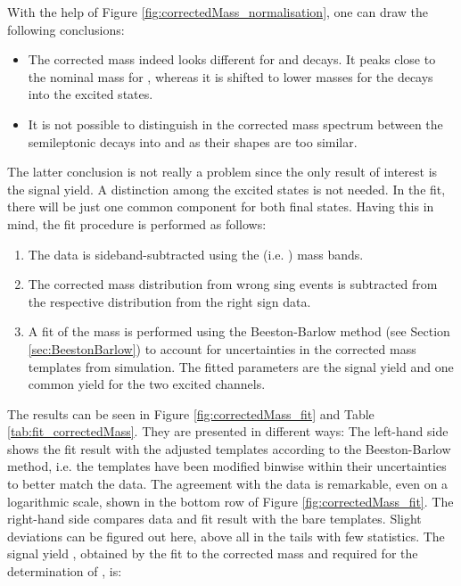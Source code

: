 \noindent With the help of Figure \ref{fig:correctedMass_normalisation}, one can draw the following conclusions:
\begin{itemize}
    \item The corrected \pKpi\mun mass indeed looks different for \LbToLcmunu and \decay{\Lb}{\Lcstar\mun\neumb} decays.
          It peaks close to the nominal \Lb mass for \LbToLcmunu, whereas it is shifted to lower masses for the decays into the excited \Lcstar states. 
    \item It is not possible to distinguish in the \Lb corrected mass spectrum between the semileptonic \Lb decays into  and  as their shapes are too similar.
\end{itemize}
The latter conclusion is not really a problem since the only result of interest is the \LbToLcmunu signal yield. 
A distinction among the excited states is not needed.
In the fit, there will be just one common component for both final states.
Having this in mind, the fit procedure is performed as follows:
\begin{enumerate}
    \item The data is sideband-subtracted using the \pKpi (i.e. \Lc) mass bands.
    \item The corrected \pKpi\mun mass distribution from wrong sing events is subtracted from the respective distribution from the right sign data.
    \item A fit of the \pKpi\mun mass is performed using the Beeston-Barlow method (see Section \ref{sec:BeestonBarlow}) to account for uncertainties in the corrected mass templates from simulation. The fitted parameters are the \Lc signal yield and one common yield for the two excited \Lcstar channels.
\end{enumerate}
The results can be seen in Figure \ref{fig:correctedMass_fit} and Table \ref{tab:fit_correctedMass}. 
They are presented in different ways:
The left-hand side shows the fit result with the adjusted templates according to the Beeston-Barlow method, i.e. the templates have been modified binwise within their uncertainties to better match the data.
The agreement with the data is remarkable, even on a logarithmic scale, shown in the bottom row of Figure \ref{fig:correctedMass_fit}.
The right-hand side compares data and fit result with the bare templates.
Slight deviations can be figured out here, above all in the tails with few statistics.
The \LbToLcmunu signal yield \NLc, obtained by the fit to the corrected \pKpi\mun mass and required for the determination of \R, is:
